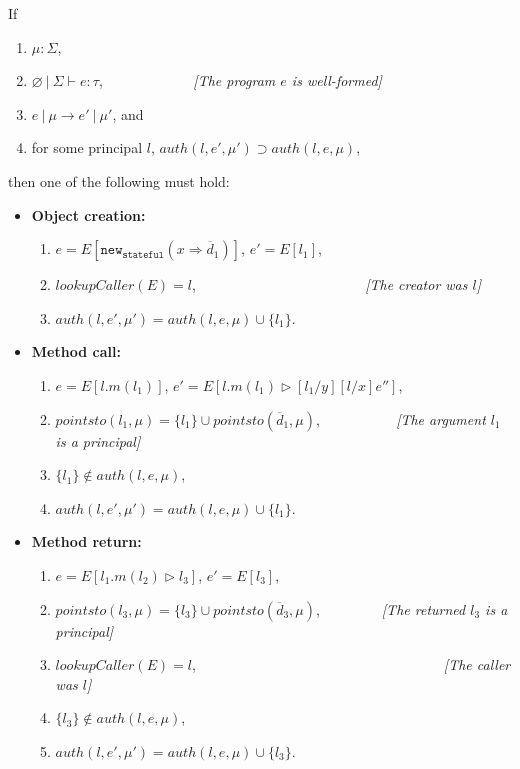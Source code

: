 \documentclass{llncs}
\newcommand{\keywadj}[1]{\mathtt{#1}}
\begin{document}
\begin{theorem} If
\begin{enumerate}
\item $\mu : \Sigma$,
\item $\varnothing~|~\Sigma \vdash e : \tau$, {\emph{~~~~~~~~~~~~[The program $e$ is well-formed]}}
\item $e~|~\mu \longrightarrow e'~|~\mu'$, and
\item for some principal $l$, $auth(l, e', \mu') \supset auth(l, e, \mu)$,
\end{enumerate}
then one of the following must hold:
\begin{itemize}
  \item \textbf{Object creation:}
  \begin{enumerate}
  \item $e = E[\keywadj{new}_{\keywadj{stateful}}(x \Rightarrow \overline{d}_1)]$, $e' = E[l_1]$,
  \item $lookupCaller(E) = l$, {\emph{~~~~~~~~~~~~~~~~~~~~~~~[The creator was $l$]}}
  \item $auth(l, e', \mu') = auth(l, e, \mu) \cup \{ l_1 \}$.\\
  \end{enumerate}
  \item \textbf{Method call:}
  \begin{enumerate}
  \item $e = E[l.m(l_1)]$, $e' = E[l.m(l_1) \rhd [l_1/y][l/x]e'']$,
  \item $pointsto(l_1,\mu) = \{ l_1 \} \cup pointsto(\overline{d}_1, \mu)$, {\emph{~~~~~~~~~~[The argument $l_1$ is a principal]}}
  \item $\{ l_1 \} \not\in auth(l, e, \mu)$,
  \item $auth(l, e', \mu') = auth(l, e, \mu) \cup \{ l_1 \}$.\\
  \end{enumerate}
  \item \textbf{Method return:}
  \begin{enumerate}
  \item $e = E[l_1.m(l_2) \rhd l_3]$, $e' = E[l_3]$,
  \item $pointsto(l_3,\mu) = \{ l_3 \} \cup pointsto(\overline{d}_3, \mu)$, {\emph{~~~~~~~~[The returned $l_3$ is a principal]}}
  \item $lookupCaller(E) = l$, {\emph{~~~~~~~~~~~~~~~~~~~~~~~~~~~~~~~~~~[The caller was $l$]}}
  \item $\{ l_3 \} \not\in auth(l, e, \mu)$,
  \item $auth(l, e', \mu') = auth(l, e, \mu) \cup \{ l_3 \}$.\\
  \end{enumerate}
\end{itemize}

\end{theorem}
\end{document}
